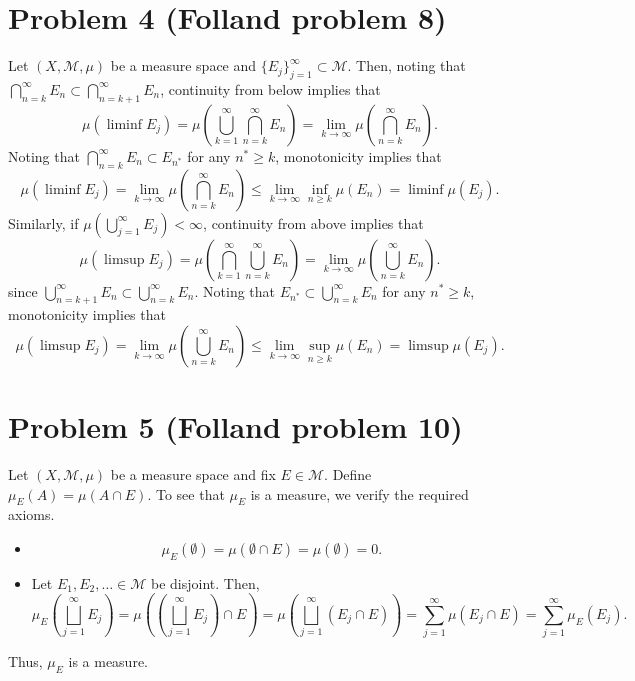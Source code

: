 \documentclass{article}
\begin{document}
\section{Problem 4 (Folland problem 8)}
Let $(X,\mathcal M,\mu)$ be a measure space and $\{E_j\}_{j=1}^\infty\subset\mathcal M$. Then, noting that $\bigcap_{n=k}^\infty E_n\subset\bigcap_{n=k+1}^\infty E_n$, continuity from below implies that 
\[
\mu(\liminf E_j)=\mu\left(\bigcup_{k=1}^\infty\bigcap_{n=k}^\infty E_n\right)=\lim_{k\to\infty}\mu\left(\bigcap_{n=k}^\infty E_n\right).
\]
Noting that $\bigcap_{n=k}^\infty E_n\subset E_{n^*}$ for any $n^*\geq k$, monotonicity implies that 
\[
\mu(\liminf E_j)=\lim_{k\to\infty}\mu\left(\bigcap_{n=k}^\infty E_n\right)\leq\lim_{k\to\infty}\inf_{n\geq k}\mu(E_n)=\liminf\mu(E_j).
\]
Similarly, if $\mu\left(\bigcup_{j=1}^\infty E_j\right)<\infty$, continuity from above implies that 
\[
\mu(\limsup E_j)=\mu\left(\bigcap_{k=1}^\infty\bigcup_{n=k}^\infty E_n\right)=\lim_{k\to\infty}\mu\left(\bigcup_{n=k}^\infty E_n\right).
\]
since $\bigcup_{n=k+1}^\infty E_n\subset\bigcup_{n=k}^\infty E_n$. Noting that $E_{n^*}\subset\bigcup_{n=k}^\infty E_n$ for any $n^*\geq k$, monotonicity implies that 
\[
\mu(\limsup E_j)=\lim_{k\to\infty}\mu\left(\bigcup_{n=k}^\infty E_n\right)\leq\lim_{k\to\infty}\sup_{n\geq k}\mu(E_n)=\limsup\mu(E_j).
\]

\section{Problem 5 (Folland problem 10)}
Let $(X,\mathcal M,\mu)$ be a measure space and fix $E\in\mathcal M$. Define $\mu_E(A)=\mu(A\cap E)$. To see that $\mu_E$ is a measure, we verify the required axioms. 
\begin{itemize}
	\item 
	\[
	\mu_E(\emptyset)=\mu(\emptyset\cap E)=\mu(\emptyset)=0.
	\]
	\item  Let $E_1,E_2,\ldots\in\mathcal M$ be disjoint. Then,
	\[
	\mu_E\left(\bigsqcup_{j=1}^\infty E_j\right)=\mu\left(\left(\bigsqcup_{j=1}^\infty E_j\right)\cap E\right)=\mu\left(\bigsqcup_{j=1}^\infty (E_j\cap E)\right)=\sum_{j=1}^{\infty}\mu(E_j\cap E)=\sum_{j=1}^\infty\mu_E(E_j).
	\]
\end{itemize}
Thus, $\mu_E$ is a measure.
\end{document}
